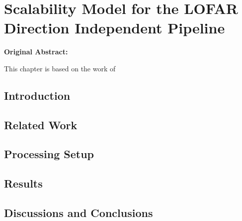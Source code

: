 \chapter{Scalability Model for the LOFAR Direction Independent Pipeline}\label{ch:Scalability_model}





\begin{tcolorbox}[colback=thesislight,colframe=thesismid,width=\dimexpr\textwidth+1mm\relax]
     \textbf{Original Abstract:}


This chapter is based on the work of  
\end{tcolorbox}


\section{\label{sec:ch6_intro}Introduction }


\section{Related Work}\label{sec:ch6_related}


\section{Processing Setup }\label{sec:ch6_methods}



\section{Results}\label{sec:ch6_results}


\section{Discussions and Conclusions}\label{sec:ch6_discussions}



